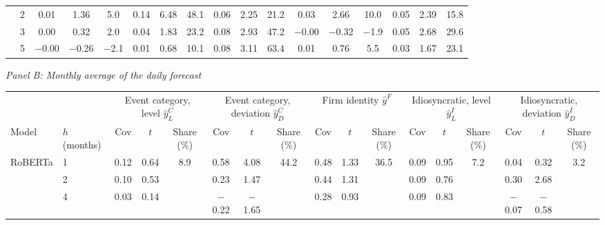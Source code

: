 \begin{table}[htbp]
{\begin{adjustbox}{max width=\linewidth, max totalheight=0.15\textheight}
\begin{tabular}{llccccccccccccccc}
 & 2 & \phantom{$-$}0.01 & \phantom{$-$}1.36 & \phantom{$-$}5.0 & 0.14 & \phantom{0}6.48 & 48.1 & \phantom{$-$}0.06 & \phantom{$-$}2.25 & \phantom{$-$}21.2 & \phantom{$-$}0.03 & \phantom{$-$}2.66 & \phantom{$-$}10.0 & 0.05 & \phantom{0}2.39 & 15.8 \\
 & 3 & \phantom{$-$}0.00 & \phantom{$-$}0.32 & \phantom{$-$}2.0 & 0.04 & \phantom{0}1.83 & 23.2 & \phantom{$-$}0.08 & \phantom{$-$}2.93 & \phantom{$-$}47.2 & $-$0.00 & $-$0.32 & \phantom{0}$-$1.9 & 0.05 & \phantom{0}2.68 & 29.6 \\
 & 5 & $-$0.00 & $-$0.26 & $-$2.1 & 0.01 & \phantom{0}0.68 & 10.1 & \phantom{$-$}0.08 & \phantom{$-$}3.11 & \phantom{$-$}63.4 & \phantom{$-$}0.01 & \phantom{$-$}0.76 & \phantom{$-$0}5.5 & 0.03 & \phantom{0}1.67 & 23.1 \\
\bottomrule
\end{tabular}
\end{adjustbox}
\par\medskip
\textit{Panel B: Monthly average of the daily forecast}\\[2pt]
\begin{adjustbox}{max width=\linewidth, max totalheight=0.20\textheight}
\begin{tabular}{llccccccccccccccc}
\toprule
\multicolumn{2}{c}{} & \multicolumn{3}{c}{Event category, level $\hat y^C_L$} & \multicolumn{3}{c}{Event category, deviation $\hat y^C_D$} & \multicolumn{3}{c}{Firm identity $\hat y^F$} & \multicolumn{3}{c}{Idiosyncratic, level $\hat y^I_L$} & \multicolumn{3}{c}{Idiosyncratic, deviation $\hat y^I_D$} \\
\cmidrule(lr){3-5} \cmidrule(lr){6-8} \cmidrule(lr){9-11} \cmidrule(lr){12-14} \cmidrule(lr){15-17}
Model & $h$ (months) & Cov & $t$ & Share (\%) & Cov & $t$ & Share (\%) & Cov & $t$ & Share (\%) & Cov & $t$ & Share (\%) & Cov & $t$ & Share (\%) \\
\midrule
RoBERTa & 1 & \phantom{$-$}0.12 & \phantom{$-$}0.64 & 8.9 & \phantom{$-$}0.58 & \phantom{$-$}4.08 & \phantom{$-$}44.2 & \phantom{$-$}0.48 & \phantom{$-$}1.33 & 36.5 & 0.09 & 0.95 & \phantom{0}7.2 & \phantom{$-$}0.04 & \phantom{$-$}0.32 & \phantom{$-$0}3.2 \\
 & 2 & \phantom{$-$}0.10 & \phantom{$-$}0.53 &  & \phantom{$-$}0.23 & \phantom{$-$}1.47 &  & \phantom{$-$}0.44 & \phantom{$-$}1.31 &  & 0.09 & 0.76 &  & \phantom{$-$}0.30 & \phantom{$-$}2.68 &  \\
 & 4 & \phantom{$-$}0.03 & \phantom{$-$}0.14 &  & $-$0.22 & $-$1.65 &  & \phantom{$-$}0.28 & \phantom{$-$}0.93 &  & 0.09 & 0.83 &  & $-$0.07 & $-$0.58 &  \\

\end{tabular}
\end{adjustbox}}
\end{table}
